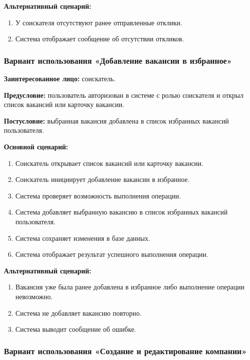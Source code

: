 \textbf{Альтернативный сценарий:}
\begin{enumerate}
	\item У соискателя отсутствуют ранее отправленные отклики.
	\item Система отображает сообщение об отсутствии откликов.
\end{enumerate}

\subsubsection{Вариант использования «Добавление вакансии в избранное»}

\textbf{Заинтересованное лицо:} соискатель.

\textbf{Предусловие:} пользователь авторизован в системе с ролью соискателя и открыл список вакансий или карточку вакансии.

\textbf{Постусловие:} выбранная вакансия добавлена в список избранных вакансий пользователя.

\textbf{Основной сценарий:}
\begin{enumerate}
	\item Соискатель открывает список вакансий или карточку вакансии.
	\item Соискатель инициирует добавление вакансии в избранное.
	\item Система проверяет возможность выполнения операции.
	\item Система добавляет выбранную вакансию в список избранных вакансий пользователя.
	\item Система сохраняет изменения в базе данных.
	\item Система отображает результат успешного выполнения операции.
\end{enumerate}

\textbf{Альтернативный сценарий:}
\begin{enumerate}
	\item Вакансия уже была ранее добавлена в избранное либо выполнение операции невозможно.
	\item Система не добавляет вакансию повторно.
	\item Система выводит сообщение об ошибке.
\end{enumerate}

\subsubsection{Вариант использования «Создание и редактирование компании»}

